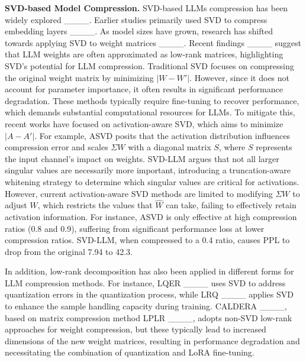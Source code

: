 \textbf{SVD-based Model Compression.}
SVD-based LLMs compression has been widely explored ____. Earlier studies primarily used SVD to compress embedding layers ____. As model sizes have grown, research has shifted towards applying SVD to weight matrices ____. Recent findings ____ suggest that LLM weights are often approximated as low-rank matrices, highlighting SVD's potential for LLM compression. Traditional SVD focuses on compressing the original weight matrix by minimizing $|W - W'|$. However, since it does not account for parameter importance, it often results in significant performance degradation. These methods typically require fine-tuning to recover performance, which demands substantial computational resources for LLMs.
To mitigate this, recent works have focused on activation-aware SVD, which aims to minimize $|A - A'|$. For example, ASVD posits that the activation distribution influences compression error and scales $\Sigma W$ with a diagonal matrix $S$, where $S$ represents the input channel’s impact on weights. SVD-LLM argues that not all larger singular values are necessarily more important, introducing a truncation-aware whitening strategy to determine which singular values are critical for activations. 
However, current activation-aware SVD methods are limited to modifying $\Sigma W$ to adjust $W$, which restricts the values that $\hat{W}$ can take, failing to effectively retain activation information. For instance, ASVD is only effective at high compression ratios (0.8 and 0.9), suffering from significant performance loss at lower compression ratios. SVD-LLM, when compressed to a 0.4 ratio, causes PPL to drop from the original 7.94 to 42.3.


In addition, low-rank decomposition has also been applied in different forms for LLM compression methods. For instance, LQER ____ uses SVD to address quantization errors in the quantization process, while LRQ ____ applies SVD to enhance the sample handling capacity during training. CALDERA ____, based on matrix compression method LPLR ____, adopts non-SVD low-rank approaches for weight compression, but these typically lead to increased dimensions of the new weight matrices, resulting in performance degradation and necessitating the combination of quantization and LoRA fine-tuning.
